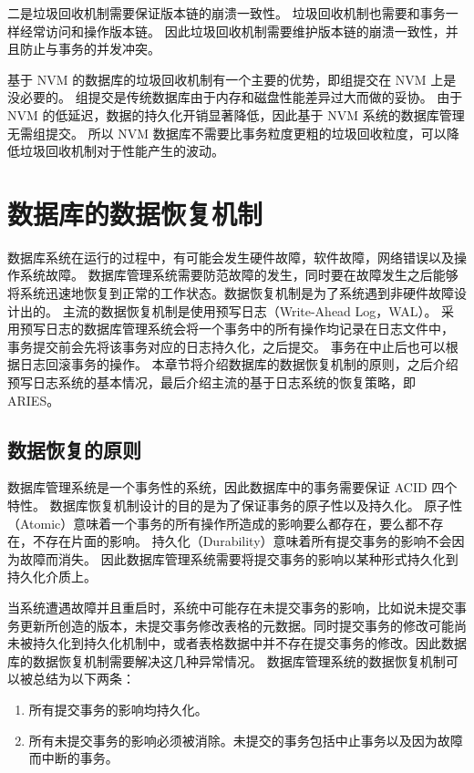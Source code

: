 二是垃圾回收机制需要保证版本链的崩溃一致性。
垃圾回收机制也需要和事务一样经常访问和操作版本链。
因此垃圾回收机制需要维护版本链的崩溃一致性，并且防止与事务的并发冲突。

基于 NVM 的数据库的垃圾回收机制有一个主要的优势，即组提交在 NVM 上是没必要的。
组提交是传统数据库由于内存和磁盘性能差异过大而做的妥协。
由于 NVM 的低延迟，数据的持久化开销显著降低，因此基于 NVM 系统的数据库管理无需组提交。
所以 NVM 数据库不需要比事务粒度更粗的垃圾回收粒度，可以降低垃圾回收机制对于性能产生的波动。


\section{数据库的数据恢复机制}

数据库系统在运行的过程中，有可能会发生硬件故障，软件故障，网络错误以及操作系统故障。
数据库管理系统需要防范故障的发生，同时要在故障发生之后能够将系统迅速地恢复到正常的工作状态。数据恢复机制是为了系统遇到非硬件故障设计出的。
主流的数据恢复机制是使用预写日志（Write-Ahead Log，WAL）。
采用预写日志的数据库管理系统会将一个事务中的所有操作均记录在日志文件中，
事务提交前会先将该事务对应的日志持久化，之后提交。
事务在中止后也可以根据日志回滚事务的操作。
本章节将介绍数据库的数据恢复机制的原则，之后介绍预写日志系统的基本情况，最后介绍主流的基于日志系统的恢复策略，即 ARIES。

\subsection{数据恢复的原则}

数据库管理系统是一个事务性的系统，因此数据库中的事务需要保证 ACID 四个特性。
数据库恢复机制设计的目的是为了保证事务的原子性以及持久化。
原子性（Atomic）意味着一个事务的所有操作所造成的影响要么都存在，要么都不存在，不存在片面的影响。
持久化（Durability）意味着所有提交事务的影响不会因为故障而消失。
因此数据库管理系统需要将提交事务的影响以某种形式持久化到持久化介质上。

当系统遭遇故障并且重启时，系统中可能存在未提交事务的影响，比如说未提交事务更新所创造的版本，未提交事务修改表格的元数据。同时提交事务的修改可能尚未被持久化到持久化机制中，或者表格数据中并不存在提交事务的修改。因此数据库的数据恢复机制需要解决这几种异常情况。
数据库管理系统的数据恢复机制可以被总结为以下两条：
\begin{enumerate}
    \item 所有提交事务的影响均持久化。
    \item 所有未提交事务的影响必须被消除。未提交的事务包括中止事务以及因为故障而中断的事务。
\end{enumerate}



